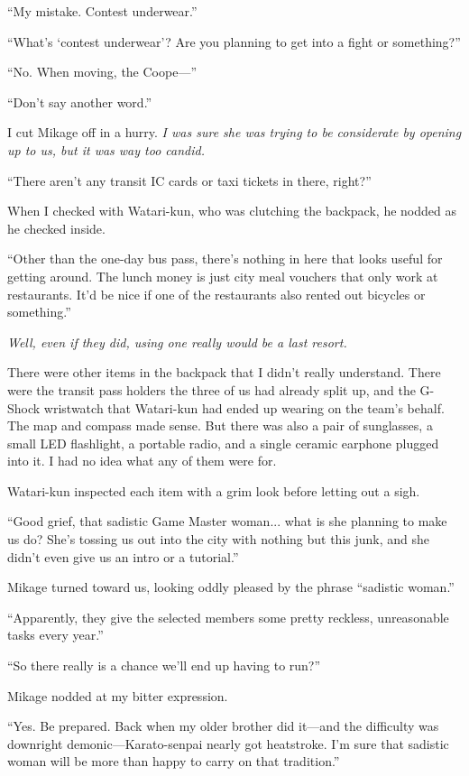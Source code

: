 \documentclass[
    a4paper,
    12pt,
    twoside,
    openany,
    UTF8,
    fontset=windows
]{ctexbook}
\begin{document}
``My mistake. Contest underwear.''

``What's `contest underwear'? Are you planning to get into a fight or something?''

``No. When moving, the Coope---''

``Don't say another word.''

I cut Mikage off in a hurry. \textit{I was sure she was trying to be considerate by opening up to us, but it was way too candid.}

``There aren't any transit IC cards or taxi tickets in there, right?''

When I checked with Watari-kun, who was clutching the backpack, he nodded as he checked inside.

``Other than the one-day bus pass, there's nothing in here that looks useful for getting around. The lunch money is just city meal vouchers that only work at restaurants. It'd be nice if one of the restaurants also rented out bicycles or something.''

\textit{Well, even if they did, using one really would be a last resort.}

There were other items in the backpack that I didn't really understand. There were the transit pass holders the three of us had already split up, and the G-Shock wristwatch that Watari-kun had ended up wearing on the team's behalf. The map and compass made sense. But there was also a pair of sunglasses, a small LED flashlight, a portable radio, and a single ceramic earphone plugged into it. I had no idea what any of them were for.

Watari-kun inspected each item with a grim look before letting out a sigh.

``Good grief, that sadistic Game Master woman... what is she planning to make us do? She's tossing us out into the city with nothing but this junk, and she didn't even give us an intro or a tutorial.''

Mikage turned toward us, looking oddly pleased by the phrase ``sadistic woman.''

``Apparently, they give the selected members some pretty reckless, unreasonable tasks every year.''

``So there really is a chance we'll end up having to run?''

Mikage nodded at my bitter expression.

``Yes. Be prepared. Back when my older brother did it---and the difficulty was downright demonic---Karato-senpai nearly got heatstroke. I'm sure that sadistic woman will be more than happy to carry on that tradition.''
\end{document}
